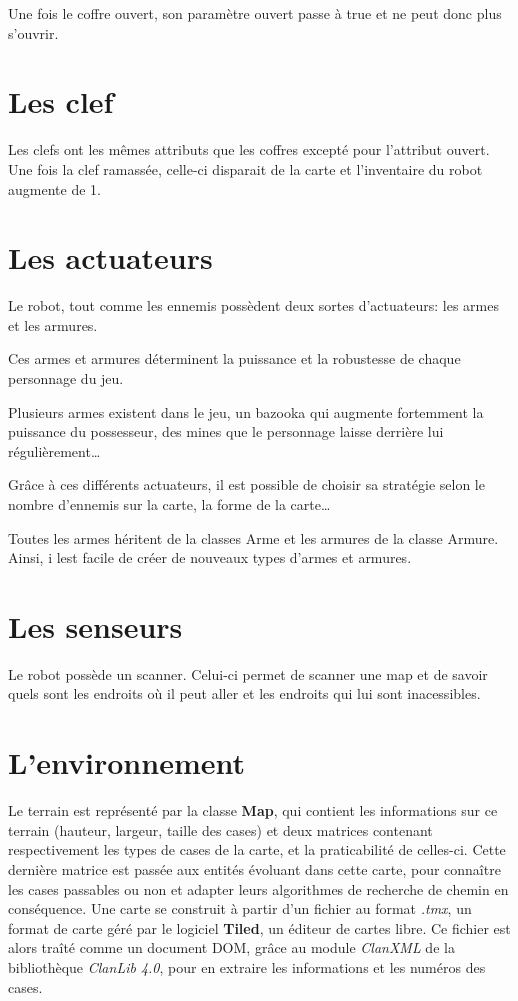 \documentclass[a4paper,12pts]{article}
\begin{document}
Une fois le coffre ouvert, son paramètre ouvert passe à true et ne peut donc plus s'ouvrir.


\section{Les clef}

Les clefs ont les mêmes attributs que les coffres excepté pour l'attribut ouvert. Une fois la clef ramassée, celle-ci disparait de la carte et l'inventaire du robot augmente de 1.

\section{Les actuateurs}

Le robot, tout comme les ennemis possèdent deux sortes d'actuateurs: les armes et les armures.

Ces armes et armures déterminent la puissance et la robustesse de chaque personnage du jeu.

Plusieurs armes existent dans le jeu, un bazooka qui augmente fortemment la puissance du possesseur, des mines que le personnage laisse derrière lui régulièrement\ldots

Grâce à ces différents actuateurs, il est possible de choisir sa stratégie selon le nombre d'ennemis sur la carte, la forme de la carte\ldots

Toutes les armes héritent de la classes Arme et les armures de la classe Armure. Ainsi, i lest facile de créer de nouveaux types d'armes et armures.

\section{Les senseurs}

Le robot possède un scanner. Celui-ci permet de scanner une map et de savoir quels sont les endroits où il peut aller et les endroits qui lui sont inacessibles.

\newpage
\section{L'environnement}

Le terrain est représenté par la classe \textbf{Map}, qui contient les informations sur ce terrain (hauteur, largeur, taille des cases) et deux matrices contenant respectivement les types de cases de la carte, et la praticabilité de celles-ci. Cette dernière matrice est passée aux entités évoluant dans cette carte, pour connaître les cases passables ou non et adapter leurs algorithmes de recherche de chemin en conséquence.
Une carte se construit à partir d'un fichier au format \emph{.tmx}, un format de carte géré par le logiciel \textbf{Tiled}, un éditeur de cartes libre. Ce fichier est alors traîté comme un document DOM, grâce au module \emph{ClanXML} de la bibliothèque \emph{ClanLib 4.0}, pour en extraire les informations et les numéros des cases.
\end{document}
